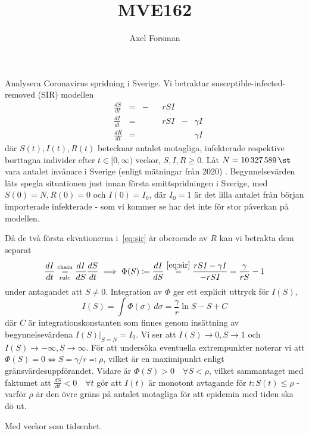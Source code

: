 \documentclass{article}
\title{MVE162}
\author{Axel Forsman}
\begin{document}

Analysera Coronavirus spridning i Sverige.
Vi betraktar susceptible-infected-removed (SIR) modellen
\begin{equation}\label{eq:sir}
	\begin{alignedat}{4}
		& \frac{dS}{dt} &=& -&&rSI && \\
		& \frac{dI}{dt} &=& &&rSI &-& \gamma I \\
		& \frac{dR}{dt} &=& && &&\gamma I
	\end{alignedat}
\end{equation}
där $S(t), I(t), R(t)$ betecknar antalet motagliga, infekterade
respektive borttagna individer efter $t \in [0, \infty)$ veckor,
$S, I, R \ge 0$.
Låt $N = \SI{10327589}{\st}$ vara antalet invånare i Sverige
(enligt mätningar från 2020) \autocite{population}.
Begynnelsevärden läts spegla situationen just innan
första smittspridningen i Sverige,
med $S(0) = N, R(0) = 0$ och $I(0) = I_0$,
där $I_0 = 1$ är det lilla antalet från början importerade infekterade -
som vi kommer se har det inte för stor påverkan på modellen. %


Då de två första ekvationerna i~\eqref{eq:sir}
är oberoende av $R$
kan vi betrakta dem separat
$$ \frac{dI}{dt} \overset{\text{chain}}{\underset{\text{rule}}=} \frac{dI}{dS} \frac{dS}{dt}
\implies \Phi(S) \coloneqq \frac{dI}{dS} \overset{\eqref{eq:sir}}= \frac{rSI - \gamma I}{-rSI} = \frac\gamma{rS} - 1 $$
under antagandet att $S \ne 0$.
Integration av $\Phi$ ger ett explicit uttryck för $I(S)$,
$$ I(S) = \int \Phi(\sigma) \, d\sigma = \frac\gamma r \ln S - S + C $$
där $C$ är integrationskonstanten som finnes genom
insättning av begynnelsevärdena $I(S) \vert_{S=N} = I_0$.
Vi ser att $I(S) \to 0, S \to 1$ och $I(S) \to -\infty, S \to \infty$.
För att undersöka eventuella extrempunkter
noterar vi att $\Phi(S) = 0 \Leftrightarrow S = \gamma / r \eqqcolon \rho$,
vilket är en maximipunkt enligt gränsvärdesuppförandet.
Vidare är $\Phi(S) > 0 \quad \forall S < \rho$,
vilket sammantaget med faktumet att
$\frac{dS}{dt} < 0 \quad \forall t$
gör att $I(t)$ är monotont avtagande för $t : S(t) \le \rho$ -
varför $\rho$ är den övre gräns på antalet motagliga
för att epidemin med tiden ska dö ut.

Med veckor som tidsenhet.
\cite{folkhalso}

\printbibliography
\end{document}
